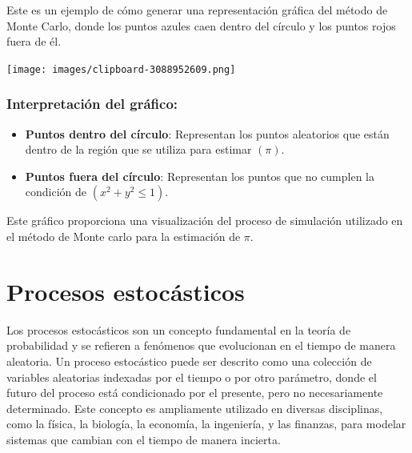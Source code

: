 \documentclass[
  us-letterpaper,
]{scrreprt}
\providecommand{\tightlist}{%
  \setlength{\itemsep}{0pt}\setlength{\parskip}{0pt}}\usepackage{longtable,booktabs,array}
\theoremstyle{plain}
\theoremstyle{plain}
\theoremstyle{definition}
\theoremstyle{remark}
\begin{document}
\begin{tcolorbox}[enhanced jigsaw, titlerule=0mm, opacityback=0, coltitle=black, bottomrule=.15mm, colbacktitle=quarto-callout-caution-color!10!white, toprule=.15mm, colback=white, arc=.35mm, colframe=quarto-callout-caution-color-frame, leftrule=.75mm, bottomtitle=1mm, left=2mm, toptitle=1mm, opacitybacktitle=0.6, breakable, title={Ejemplo (\textbf{\emph{Monte Carlo}})}, rightrule=.15mm]

Este es un ejemplo de cómo generar una representación gráfica del método
de Monte Carlo, donde los puntos azules caen dentro del círculo y los
puntos rojos fuera de él.

\begin{center}
\texttt{[image: images/clipboard-3088952609.png]}
\end{center}

\subsection{Interpretación del
gráfico:}\label{interpretaciuxf3n-del-gruxe1fico}

\begin{itemize}
\tightlist
\item
  \textbf{Puntos dentro del círculo}: Representan los puntos aleatorios
  que están dentro de la región que se utiliza para estimar \((\pi)\).
\item
  \textbf{Puntos fuera del círculo}: Representan los puntos que no
  cumplen la condición de \((x^2 + y^2 \leq 1)\).
\end{itemize}

Este gráfico proporciona una visualización del proceso de simulación
utilizado en el método de Monte carlo para la estimación de \(\pi\).

\end{tcolorbox}

\chapter{Procesos estocásticos}\label{procesos-estocuxe1sticos}

Los procesos estocásticos son un concepto fundamental en la teoría de
probabilidad y se refieren a fenómenos que evolucionan en el tiempo de
manera aleatoria. Un proceso estocástico puede ser descrito como una
colección de variables aleatorias indexadas por el tiempo o por otro
parámetro, donde el futuro del proceso está condicionado por el
presente, pero no necesariamente determinado. Este concepto es
ampliamente utilizado en diversas disciplinas, como la física, la
biología, la economía, la ingeniería, y las finanzas, para modelar
sistemas que cambian con el tiempo de manera incierta.
\end{document}
